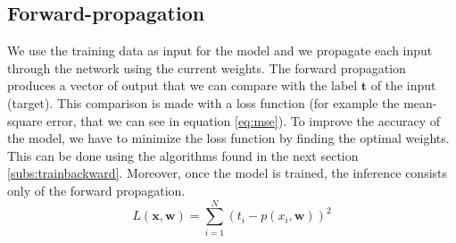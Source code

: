 \subsection{Forward-propagation} \label{subs:trainforward}
We use the training data as input for the model and we propagate each input through the network using the current weights. The forward propagation produces a vector of output that we can compare with the label $\boldsymbol{t}$ of the input (target). This comparison is made with a loss function (for example the mean-square error, that we can see in equation \eqref{eq:mse}). To improve the accuracy of the model, we have to minimize the loss function by finding the optimal weights. This can be done using the algorithms found in the next section \ref{subs:trainbackward}. Moreover, once the model is trained, the inference consists only of the forward propagation.
%
\begin{equation}
    L(\boldsymbol{x}, \boldsymbol{w}) = \sum^{N}_{i=1} (t_i - p(x_i, \boldsymbol{w}))^2
    \label{eq:mse}
\end{equation}
